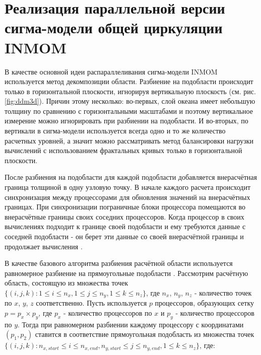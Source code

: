 \section{Реализация параллельной версии сигма-модели общей циркуляции INMOM}\label{sec:inmsom/ch2/sec1}
    В качестве основной идеи распараллеливания сигма-модели INMOM используется метод декомпозиции области.
    Разбиение на подобласти происходит только в горизонтальной плоскости, игнорируя вертикальную плоскость (см. рис. \ref{fig:ddm3d}). 
    Причин этому несколько: во-первых, слой океана имеет небольшую толщину по сравнению с горизонтальными масштабами и поэтому вертикальное измерение можно игнорировать
	при разбиении на подобласти.
	И во-вторых, по вертикали в сигма-модели используется всегда одно и то же количество
	расчетных уровней, а значит можно рассматривать метод балансировки нагрузки вычислений с использованием фрактальных кривых только в горизонтальной плоскости.

    После разбиения на подобласти для каждой подобласти добавляется внерасчётная граница толщиной в одну узловую точку. 
    В начале каждого расчета происходит синхронизация между процессорами для обновления значений на внерасчётных границах.
    При синхронизации пограничные блоки процессора помещаются во внерасчётные границы своих соседних процессоров.
    Когда процессор в своих вычислениях подходит к границе своей подобласти и ему требуются данные с соседней подобласти - он берет эти данные 
    со своей внерасчётной границы и продолжает вычисления \cite{GuansuoWang}.
   
    
    В качестве базового алгоритма разбиения расчётной области используется равномерное разбиение на прямоугольные подобласти \cite{ChaplyginINMOM2017}.     
    Рассмотрим расчётную область, состоящую из множества точек $\{ (i, j, k) : 1 \leq i \leq n_x,  1 \leq j \leq n_y, 1 \leq k \leq n_z \}$,
    где $n_x$, $n_y$, $n_z$ - количество точек по $x$, $y$, $z$ соответственно. 
    Пусть используется $p$ процессоров, образующих сетку $p = p_{x} \times p_{y}$,
    где $p_x$ - количество процессоров по $x$ и $p_y$ - количество процессоров по $y$. 
    Тогда при равномерном разбиении каждому процессору с координатами $(p_1, p_2)$ ставится в соответствие прямоугольная подобласть из множества точек
    $\{ (i, j, k) :  n_{x, start} \leq i \leq n_{x, end} , n_{y, start} \leq j \leq n_{y, end}, 1 \leq k \leq n_z \}$, где:  
    
